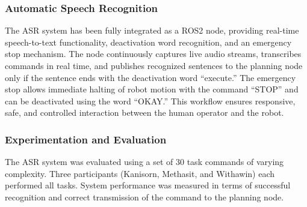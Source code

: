 \documentclass[12pt]{extarticle}
\begin{document}
\subsubsection{Automatic Speech Recognition}

The ASR system has been fully integrated as a ROS2 node, providing real-time speech-to-text functionality, deactivation word recognition, and an emergency stop mechanism. The node continuously captures live audio streams, transcribes commands in real time, and publishes recognized sentences to the planning node only if the sentence ends with the deactivation word ``execute.'' The emergency stop allows immediate halting of robot motion with the command ``STOP'' and can be deactivated using the word ``OKAY.'' This workflow ensures responsive, safe, and controlled interaction between the human operator and the robot.

\subsubsection{Experimentation and Evaluation}

The ASR system was evaluated using a set of 30 task commands of varying complexity. Three participants (Kanisorn, Methasit, and Withawin) each performed all tasks. System performance was measured in terms of successful recognition and correct transmission of the command to the planning node.
\end{document}
